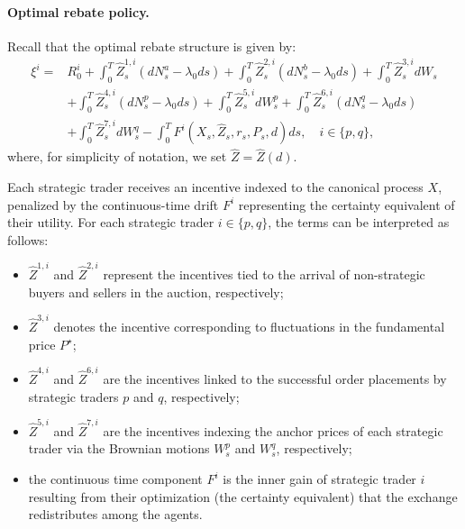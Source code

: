 \documentclass[12pt]{article}
\begin{document}
\paragraph{Optimal rebate policy.} 
Recall that the optimal rebate structure is given by:
\begin{align*}
    \xi^i =& R^i_0 + \int_0^T \hat{Z}^{1,i}_s (dN^{a}_s - \lambda_0 ds) + \int_0^T \hat{Z}^{2,i}_s (dN^{b}_s - \lambda_0 ds) + \int_0^T \hat{Z}^{3,i}_s dW_s \\
    &+ \int_0^T \hat{Z}^{4,i}_s (dN^p_s - \lambda_0 ds) + \int_0^T \hat{Z}^{5,i}_s dW^{p}_s + \int_0^T \hat{Z}^{6,i}_s (dN^{q}_s - \lambda_0 ds) \\
    &+ \int_0^T \hat{Z}^{7,i}_s dW^{q}_s - \int_0^T F^i(X_s,\hat{Z}_s,r_s,P_s,d) ds, \quad i \in \{p,q\},
\end{align*}
where, for simplicity of notation, we set $\hat{Z} = \hat{Z}(d)$. 

Each strategic trader receives an incentive indexed to the canonical process $X$, penalized by the continuous-time drift $F^i$ representing the certainty equivalent of their utility. For each strategic trader $i \in \{p,q\}$, the terms can be interpreted as follows:
\begin{itemize}
    \item $\hat{Z}^{1,i}$ and $\hat{Z}^{2,i}$ represent the incentives tied to the arrival of non-strategic buyers and sellers in the auction, respectively;
    \item $\hat{Z}^{3,i}$ denotes the incentive corresponding to fluctuations in the fundamental price $P^\star$;
    \item $\hat{Z}^{4,i}$ and $\hat{Z}^{6,i}$ are the incentives linked to the successful order placements by strategic traders $p$ and $q$, respectively;
    \item $\hat{Z}^{5,i}$ and $\hat{Z}^{7,i}$ are the incentives indexing the anchor prices of each strategic trader via the Brownian motions $W_s^p$ and $W_s^q$, respectively;
    \item the continuous time component $F^i$ is the inner gain of strategic trader $i$ resulting from their optimization (the certainty equivalent) that the exchange redistributes among the agents. 
\end{itemize}
\end{document}
